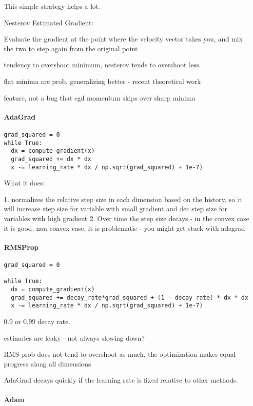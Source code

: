 This simple strategy helps a lot.

Nesterov Estimated Gradient: 

Evaluate the gradient at the point where the velocity vector takes you, and mix the two to step again from the original point

tendency to overshoot minimum, nesterov tends to overshoot less.

flat minima are prob. generalizing better - recent theoretical work

feature, not a bug that sgd momentum skips over sharp minima

\paragraph{AdaGrad}

\begin{verbatim}
grad_squared = 0
while True:
  dx = compute-gradient(x)
  grad_squared += dx * dx 
  x -= learning_rate * dx / np.sqrt(grad_squared) + 1e-7)
\end{verbatim}

What it does: 

1. normalizes the relative step size in each dimension based on the history, so it will increase step size for variable with small gradient and dec step size for variables with high gradient
2. Over time the step size decays - in the convex case it is good. non convex case, it is problematic - you might get stuck with adagrad

\paragraph{RMSProp}
\begin{verbatim}
grad_squared = 0

while True:
  dx = compute_gradient(x)
  grad_squared += decay_rate*grad_squared + (1 - decay rate) * dx * dx
  x -= learning_rate * dx / np.sqrt(grad_squared) + 1e-7)
\end{verbatim}

0.9 or 0.99 decay rate.

estimates are leaky - not always slowing down?

RMS prob does not tend to overshoot as much, the optimization makes equal progress along all dimensions

AdaGrad decays quickly if the learning rate is fixed relative to other methods.

\paragraph{Adam}

